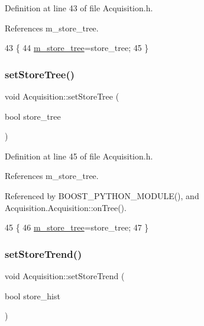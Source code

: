 Definition at line 43 of file Acquisition.\+h.



References m\+\_\+store\+\_\+tree.


\begin{DoxyCode}
43                                     \{
44     \hyperlink{classAcquisition_aca2143e9135e25554e58327475a767c5}{m\_store\_tree}=store\_tree;
45   \}
\end{DoxyCode}
\mbox{\label{classAcquisition_a759193856d26354722e5f647e60e16de}} 
\subsubsection{\texorpdfstring{set\+Store\+Tree()}{setStoreTree()}\hspace{0.1cm}{\footnotesize\ttfamily [2/2]}}
{\footnotesize\ttfamily void Acquisition\+::set\+Store\+Tree (\begin{DoxyParamCaption}\item[{bool}]{store\+\_\+tree }\end{DoxyParamCaption})\hspace{0.3cm}{\ttfamily [inline]}}



Definition at line 45 of file Acquisition.\+h.



References m\+\_\+store\+\_\+tree.



Referenced by B\+O\+O\+S\+T\+\_\+\+P\+Y\+T\+H\+O\+N\+\_\+\+M\+O\+D\+U\+L\+E(), and Acquisition.\+Acquisition\+::on\+Tree().


\begin{DoxyCode}
45                                     \{
46     \hyperlink{classAcquisition_aca2143e9135e25554e58327475a767c5}{m\_store\_tree}=store\_tree;
47   \}
\end{DoxyCode}
\mbox{\label{classAcquisition_a1ceff272a1ad030dcd20c0dcddc65443}} 
\subsubsection{\texorpdfstring{set\+Store\+Trend()}{setStoreTrend()}\hspace{0.1cm}{\footnotesize\ttfamily [1/2]}}
{\footnotesize\ttfamily void Acquisition\+::set\+Store\+Trend (\begin{DoxyParamCaption}\item[{bool}]{store\+\_\+hist }\end{DoxyParamCaption})\hspace{0.3cm}{\ttfamily [inline]}}



